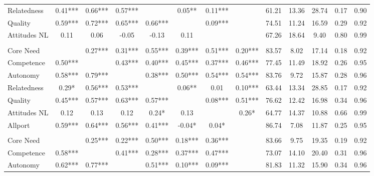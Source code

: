 \begin{table}
\begin{minipage}[t][\textheight][t]{\textwidth}
{\begin{tabular}[t]{lcccccccccccc}
\hspace{1em}Relatedness & 0.41*** & 0.66*** & 0.57*** &  & 0.05** & 0.11*** &  & 61.21 & 13.36 & 28.74 & 0.17 & 0.90\\
\hspace{1em}Quality & 0.59*** & 0.72*** & 0.65*** & 0.66*** &  & 0.09*** &  & 74.51 & 11.24 & 16.59 & 0.29 & 0.92\\
\hspace{1em}Attitudes NL & 0.11 & 0.06 & -0.05 & -0.13 & 0.11 &  &  & 67.26 & 18.64 & 9.40 & 0.80 & 0.99\\
\addlinespace[0.3em]
\multicolumn{13}{l}{\textbf{Study 3}}\\
\hspace{1em}Core Need &  & 0.27*** & 0.31*** & 0.55*** & 0.39*** & 0.51*** & 0.20*** & 83.57 & 8.02 & 17.14 & 0.18 & 0.92\\
\hspace{1em}Competence & 0.50*** &  & 0.43*** & 0.40*** & 0.45*** & 0.37*** & 0.46*** & 77.45 & 11.49 & 18.92 & 0.26 & 0.95\\
\hspace{1em}Autonomy & 0.58*** & 0.79*** &  & 0.38*** & 0.50*** & 0.54*** & 0.54*** & 83.76 & 9.72 & 15.87 & 0.28 & 0.96\\
\hspace{1em}Relatedness & 0.29* & 0.56*** & 0.53*** &  & 0.06** & 0.01 & 0.10*** & 63.44 & 13.34 & 28.85 & 0.17 & 0.92\\
\hspace{1em}Quality & 0.45*** & 0.57*** & 0.63*** & 0.57*** &  & 0.08*** & 0.51*** & 76.62 & 12.42 & 16.98 & 0.34 & 0.96\\
\hspace{1em}Attitudes NL & 0.12 & 0.13 & 0.12 & 0.24* & 0.13 &  & 0.26* & 64.77 & 14.37 & 10.88 & 0.66 & 0.99\\
\hspace{1em}Allport & 0.59*** & 0.64*** & 0.56*** & 0.41*** & -0.04* & 0.04* &  & 86.74 & 7.08 & 11.87 & 0.25 & 0.95\\
\addlinespace[0.3em]
\multicolumn{13}{l}{\textbf{Across Studies}}\\
\hspace{1em}Core Need &  & 0.25*** & 0.22*** & 0.50*** & 0.18*** & 0.36*** &  & 83.66 & 9.75 & 19.35 & 0.19 & 0.92\\
\hspace{1em}Competence & 0.58*** &  & 0.41*** & 0.28*** & 0.37*** & 0.47*** &  & 73.07 & 14.10 & 20.40 & 0.31 & 0.96\\
\hspace{1em}Autonomy & 0.62*** & 0.77*** &  & 0.51*** & 0.10*** & 0.09*** &  & 81.83 & 11.32 & 15.90 & 0.34 & 0.96\\

\end{tabular}}
\end{minipage}
\end{table}
